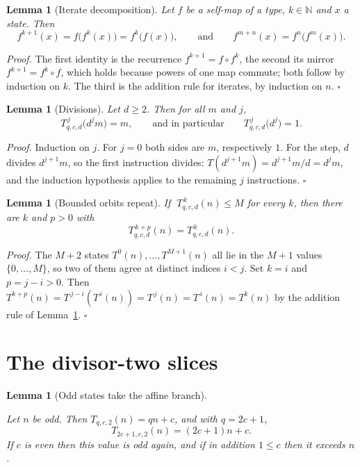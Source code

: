 \documentclass[11pt,letterpaper]{article}
\newcommand{\N}{\mathbb{N}}
\newtheorem{lemma}[theorem]{Lemma}
\newenvironment{proof}{\noindent\textit{Proof.}}{\hfill\(\square\)}
\begin{document}
\begin{lemma}[Iterate decomposition]\label{Lem:IterateSplit}
Let \(f\) be a self-map of a type, \(k\in\N\) and \(x\) a state. Then
\[
 f^{k+1}(x)=f\bigl(f^{k}(x)\bigr)=f^{k}\bigl(f(x)\bigr),
 \qquad\text{and}\qquad
 f^{m+n}(x)=f^{n}\bigl(f^{m}(x)\bigr) .
\]
\end{lemma}

\begin{proof}
The first identity is the recurrence \(f^{k+1}=f\circ f^{k}\), the second its
mirror \(f^{k+1}=f^{k}\circ f\), which holds because powers of one map
commute; both follow by induction on \(k\). The third is the addition rule for
iterates, by induction on \(n\).
\end{proof}

\begin{lemma}[Divisions]\label{Lem:Divisions}
Let \(d\ge2\). Then for all \(m\) and \(j\),
\[
 T_{q,c,d}^{\,j}\bigl(d^{j}m\bigr)=m ,
 \qquad\text{and in particular}\qquad
 T_{q,c,d}^{\,j}\bigl(d^{j}\bigr)=1 .
\]
\end{lemma}

\begin{proof}
Induction on \(j\). For \(j=0\) both sides are \(m\), respectively \(1\). For
the step, \(d\) divides \(d^{j+1}m\), so the first instruction divides:
\(T(d^{j+1}m)=d^{j+1}m/d=d^{j}m\), and the induction hypothesis applies to the
remaining \(j\) instructions.
\end{proof}

\begin{lemma}[Bounded orbits repeat]\label{Lem:Pigeonhole}
If \(\;T_{q,c,d}^{\,k}(n)\le M\) for every \(k\), then there are \(k\) and
\(p>0\) with
\[
 T_{q,c,d}^{\,k+p}(n)=T_{q,c,d}^{\,k}(n) .
\]
\end{lemma}

\begin{proof}
The \(M+2\) states \(T^{0}(n),\dots,T^{M+1}(n)\) all lie in the \(M+1\) values
\(\{0,\dots,M\}\), so two of them agree at distinct indices \(i<j\). Set
\(k=i\) and \(p=j-i>0\). Then
\(T^{k+p}(n)=T^{\,j-i}(T^{\,i}(n))=T^{\,j}(n)=T^{\,i}(n)=T^{k}(n)\)
by the addition rule of Lemma~\ref{Lem:IterateSplit}.
\end{proof}

\section{The divisor-two slices}

\begin{lemma}[Odd states take the affine branch]\label{Lem:TwoOdd}
\leavevmode\par
Let \(n\) be odd. Then \(T_{q,c,2}(n)=qn+c\), and with \(q=2c+1\),
\[
 T_{2c+1,c,2}(n)=(2c+1)n+c .
\]
If \(c\) is even then this value is odd again, and if in addition \(1\le c\)
then it exceeds \(n\).
\end{lemma}
\end{document}
